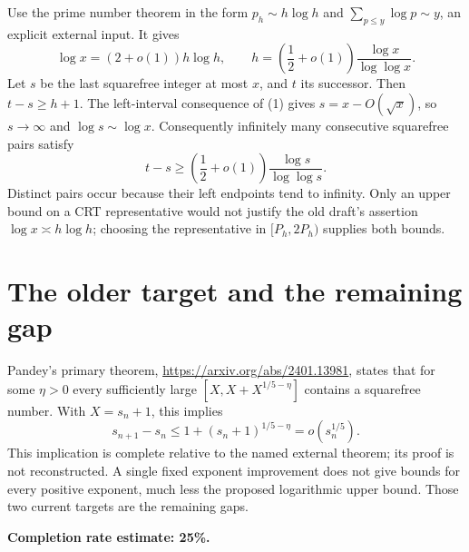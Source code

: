 \documentclass[11pt]{article}
\begin{document}
Use the prime number theorem in the form $p_h\sim h\log h$ and $\sum_{p\le y}\log p\sim y$, an explicit external input. It gives
\[
 \log x=(2+o(1))h\log h,\qquad
 h=\left(\frac12+o(1)\right)\frac{\log x}{\log\log x}.
\]
Let $s$ be the last squarefree integer at most $x$, and $t$ its successor. Then $t-s\ge h+1$. The left-interval consequence of (1) gives $s=x-O(\sqrt x)$, so $s\to\infty$ and $\log s\sim\log x$. Consequently infinitely many consecutive squarefree pairs satisfy
\[
 t-s\ge\left(\frac12+o(1)\right)\frac{\log s}{\log\log s}. \tag{2}
\]
Distinct pairs occur because their left endpoints tend to infinity. Only an upper bound on a CRT representative would not justify the old draft's assertion $\log x\asymp h\log h$; choosing the representative in $[P_h,2P_h)$ supplies both bounds.

\section*{The older target and the remaining gap}
Pandey's primary theorem, \url{https://arxiv.org/abs/2401.13981}, states that for some $\eta>0$ every sufficiently large $[X,X+X^{1/5-\eta}]$ contains a squarefree number. With $X=s_n+1$, this implies
\[
 s_{n+1}-s_n\le1+(s_n+1)^{1/5-\eta}=o(s_n^{1/5}).
\]
This implication is complete relative to the named external theorem; its proof is not reconstructed. A single fixed exponent improvement does not give bounds for every positive exponent, much less the proposed logarithmic upper bound. Those two current targets are the remaining gaps.

\textbf{Completion rate estimate: 25\%.}
\end{document}
